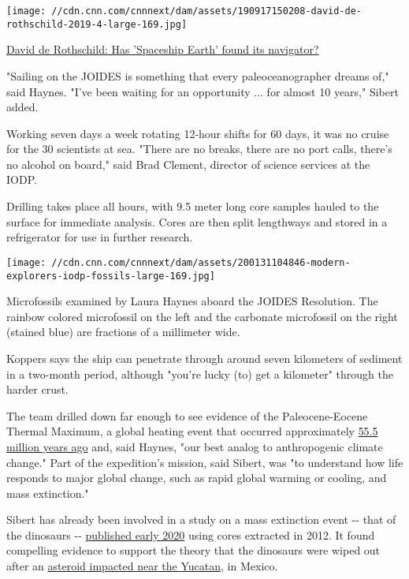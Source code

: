 \texttt{[image: //cdn.cnn.com/cnnnext/dam/assets/190917150208-david-de-rothschild-2019-4-large-169.jpg]}

\href{/2019/10/08/world/david-de-rothschild-modern-explorers/index.html}{David
de Rothschild: Has 'Spaceship Earth' found its navigator?}

"Sailing on the JOIDES is something that every paleoceanographer dreams
of," said Haynes. "I've been waiting for an opportunity ... for almost
10 years," Sibert added.

Working seven days a week rotating 12-hour shifts for 60 days, it was no
cruise for the 30 scientists at sea. "There are no breaks, there are no
port calls, there's no alcohol on board," said Brad Clement, director of
science services at the IODP.

Drilling takes place all hours, with 9.5 meter long core samples hauled
to the surface for immediate analysis. Cores are then split lengthways
and stored in a refrigerator for use in further research.

\texttt{[image: //cdn.cnn.com/cnnnext/dam/assets/200131104846-modern-explorers-iodp-fossils-large-169.jpg]}

Microfossils examined by Laura Haynes aboard the JOIDES Resolution. The
rainbow colored microfossil on the left and the carbonate microfossil on
the right (stained blue) are fractions of a millimeter wide.

Koppers says the ship can penetrate through around seven kilometers of
sediment in a two-month period, although "you're lucky (to) get a
kilometer" through the harder crust.

The team drilled down far enough to see evidence of the Paleocene-Eocene
Thermal Maximum, a global heating event that occurred approximately
\href{https://ui.adsabs.harvard.edu/abs/2015NatGe...8...44B/abstract}{55.5
million years ago} and, said Haynes, "our best analog to anthropogenic
climate change." Part of the expedition's mission, said Sibert, was "to
understand how life responds to major global change, such as rapid
global warming or cooling, and mass extinction."

Sibert has already been involved in a study on a mass extinction event
-\/- that of the dinosaurs -\/-
\href{https://science.sciencemag.org/content/367/6475/266?rss=1}{published
early 2020} using cores extracted in 2012. It found compelling evidence
to support the theory that the dinosaurs were wiped out after an
\href{https://edition.cnn.com/2020/01/16/world/dinosaur-extinction-volcanoes-asteroid-scn/index.html}{asteroid
impacted near the Yucatan}, in Mexico.

